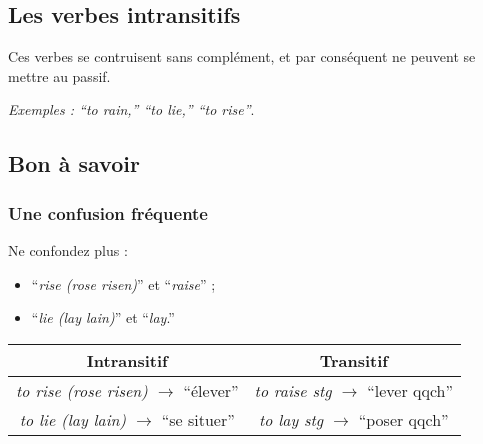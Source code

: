 \documentclass[
  10pt,
]{article}
\providecommand{\tightlist}{%
  \setlength{\itemsep}{0pt}\setlength{\parskip}{0pt}}
\begin{document}
\hypertarget{les-verbes-intransitifs}{%
\subsection{Les verbes intransitifs}\label{les-verbes-intransitifs}}

Ces verbes se contruisent sans complément, et par conséquent ne peuvent se mettre au passif.

\emph{Exemples : ``to rain,'' ``to lie,'' ``to rise''}.

\hypertarget{bon-uxe0-savoir-1}{%
\subsection{Bon à savoir}\label{bon-uxe0-savoir-1}}

\hypertarget{une-confusion-fruxe9quente}{%
\subsubsection{Une confusion fréquente}\label{une-confusion-fruxe9quente}}

Ne confondez plus :

\begin{itemize}
\tightlist
\item
  ``\emph{rise (rose risen)}'' et ``\emph{raise}'' ;
\item
  ``\emph{lie (lay lain)}'' et ``\emph{lay}.''
\end{itemize}

\begin{longtable}[]{@{}cc@{}}
\toprule
\begin{minipage}[b]{0.48\columnwidth}\centering
\textbf{Intransitif}\strut
\end{minipage} & \begin{minipage}[b]{0.46\columnwidth}\centering
\textbf{Transitif}\strut
\end{minipage}\tabularnewline
\midrule
\endhead
\begin{minipage}[t]{0.48\columnwidth}\centering
\emph{to rise (rose risen)} \(\rightarrow\) ``élever''\strut
\end{minipage} & \begin{minipage}[t]{0.46\columnwidth}\centering
\emph{to raise stg} \(\rightarrow\) ``lever qqch''\strut
\end{minipage}\tabularnewline
\begin{minipage}[t]{0.48\columnwidth}\centering
\emph{to lie (lay lain)} \(\rightarrow\) ``se situer''\strut
\end{minipage} & \begin{minipage}[t]{0.46\columnwidth}\centering
\emph{to lay stg} \(\rightarrow\) ``poser qqch''\strut
\end{minipage}\tabularnewline
\bottomrule
\end{longtable}
\end{document}
